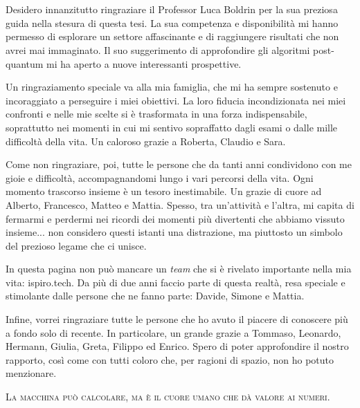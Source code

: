 \cleardoublepage
\thispagestyle{empty}
\begin{center}
    \fortypt\bfseries{}\\[15pt]
    \\
\end{center}


Desidero innanzitutto ringraziare il Professor Luca Boldrin per la sua preziosa guida nella stesura di questa tesi. La sua competenza e disponibilità mi hanno permesso di esplorare un settore affascinante e di raggiungere risultati che non avrei mai immaginato. Il suo suggerimento di approfondire gli algoritmi post-quantum mi ha aperto a nuove interessanti prospettive.

Un ringraziamento speciale va alla mia famiglia, che mi ha sempre sostenuto e incoraggiato a perseguire i miei obiettivi. La loro fiducia incondizionata nei miei confronti e nelle mie scelte si è trasformata in una forza indispensabile, soprattutto nei momenti in cui mi sentivo sopraffatto dagli esami o dalle mille difficoltà della vita. Un caloroso grazie a Roberta, Claudio e Sara.

Come non ringraziare, poi, tutte le persone che da tanti anni condividono con me gioie e difficoltà, accompagnandomi lungo i vari percorsi della vita. Ogni momento trascorso insieme è un tesoro inestimabile. Un grazie di cuore ad Alberto, Francesco, Matteo e Mattia. Spesso, tra un’attività e l’altra, mi capita di fermarmi e perdermi nei ricordi dei momenti più divertenti che abbiamo vissuto insieme... non considero questi istanti una distrazione, ma piuttosto un simbolo del prezioso legame che ci unisce.

In questa pagina non può mancare un \textit{team} che si è rivelato importante nella mia vita: ispiro.tech. Da più di due anni faccio parte di questa realtà, resa speciale e stimolante dalle persone che ne fanno parte: Davide, Simone e Mattia.

Infine, vorrei ringraziare tutte le persone che ho avuto il piacere di conoscere più a fondo solo di recente. In particolare, un grande grazie a Tommaso, Leonardo, Hermann, Giulia, Greta, Filippo ed Enrico. Spero di poter approfondire il nostro rapporto, così come con tutti coloro che, per ragioni di spazio, non ho potuto menzionare.


\begin{flushright}
    \textsc{La macchina può calcolare, ma è il cuore umano che dà valore ai numeri.}
\end{flushright}
\vspace{.5cm}
\cleardoublepage

